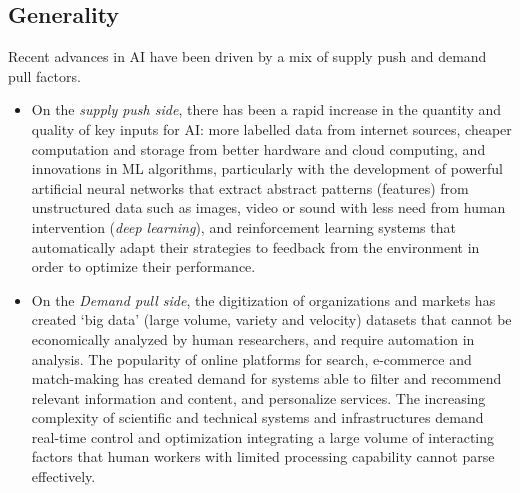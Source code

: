 \documentclass[11pt]{article}
\begin{document}
\subsection{Generality}
\label{subsec:general}
Recent advances in AI have been driven by a mix of supply push and demand pull factors. 

\begin{itemize}
    \item On the \textit{supply push side}, there has been a rapid increase in the quantity and quality of key inputs for AI: more labelled data from internet sources, cheaper computation and storage from better hardware and cloud computing, and innovations in ML algorithms, particularly with the development of powerful artificial neural networks that extract abstract patterns (features) from unstructured data such as images, video or sound with less need from human intervention (\textit{deep learning}), and reinforcement learning systems that automatically adapt their strategies to feedback from the environment in order to optimize their performance. 
    \item On the \textit{Demand pull side}, the digitization of organizations and markets has created `big data' (large volume, variety and velocity) datasets that cannot be economically analyzed by human researchers, and require automation in analysis. The popularity of online platforms for search, e-commerce and match-making has created demand for systems able to filter and recommend relevant information and content, and personalize services. The increasing complexity of scientific and technical systems and infrastructures demand real-time control and optimization integrating a large volume of interacting factors that human workers with limited processing capability cannot parse effectively.
\end{itemize}
\end{document}
